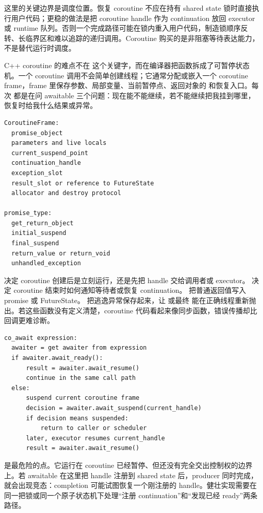 这里的关键边界是调度位置。恢复 coroutine 不应在持有 shared state 锁时直接执行用户代码；更稳的做法是把 coroutine handle 作为 continuation 放回 executor 或 runtime 队列。否则一个完成路径可能在锁内重入用户代码，制造锁顺序反转、长临界区和难以追踪的递归调用。Coroutine 购买的是非阻塞等待表达能力，不是替代运行时调度。

C++ coroutine 的难点不在  这个关键字，而在编译器把函数拆成了可暂停状态机。一个 coroutine 调用不会简单创建线程；它通常分配或嵌入一个 coroutine frame，frame 里保存参数、局部变量、当前暂停点、返回对象的  和恢复入口。每次  都是在问 awaitable 三个问题：现在能不能继续，若不能继续把我挂到哪里，恢复时给我什么结果或异常。

\begin{lstlisting}[numbers=none,caption={coroutine frame 的概念字段}]
CoroutineFrame:
  promise_object
  parameters and live locals
  current_suspend_point
  continuation_handle
  exception_slot
  result_slot or reference to FutureState
  allocator and destroy protocol

promise_type:
  get_return_object
  initial_suspend
  final_suspend
  return_value or return_void
  unhandled_exception
\end{lstlisting}

 决定 coroutine 创建后是立刻运行，还是先把 handle 交给调用者或 executor。 决定 coroutine 结束时如何通知等待者或恢复 continuation。 把普通返回值写入 promise 或 FutureState。 把逃逸异常保存起来，让  或最终  能在正确线程重新抛出。若这些函数没有定义清楚，coroutine 代码看起来像同步函数，错误传播却比回调更难诊断。

\begin{lstlisting}[numbers=none,caption={co\_await 的三段合同}]
co_await expression:
  awaiter = get awaiter from expression
  if awaiter.await_ready():
      result = awaiter.await_resume()
      continue in the same call path
  else:
      suspend current coroutine frame
      decision = awaiter.await_suspend(current_handle)
      if decision means suspended:
          return to caller or scheduler
      later, executor resumes current_handle
      result = awaiter.await_resume()
\end{lstlisting}

 是最危险的点。它运行在 coroutine 已经暂停、但还没有完全交出控制权的边界上。若 awaitable 在这里把 handle 注册到 shared state 后，producer 同时完成，就会出现竞态：completion 可能试图恢复一个刚注册的 handle。健壮实现需要在同一把锁或同一个原子状态机下处理“注册 continuation”和“发现已经 ready”两条路径。

